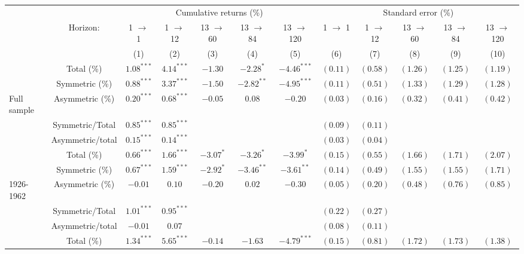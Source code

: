 \begin{tabular}{lccccccccccc}
   \toprule & & \multicolumn{5}{c}{Cumulative returns (\%)} & \multicolumn{5}{c}{Standard error (\%)} \\
 \cmidrule(l){2-7} \cmidrule(l){8-12} & Horizon: & 1 $\rightarrow$ 1 & 1 $\rightarrow$ 12 & 13 $\rightarrow$ 60 & 13 $\rightarrow$ 84 & 13 $\rightarrow$ 120 & 1 $\rightarrow$ 1 & 1 $\rightarrow$ 12 & 13 $\rightarrow$ 60 & 13 $\rightarrow$ 84 & 13 $\rightarrow$ 120 \\ 
   \cmidrule(l){3-7} \cmidrule(l){8-12} \vspace{5pt} &  & (1) & (2) & (3) & (4) & (5) & (6) & (7) & (8) & (9) & (10) \\ 
   & Total (\%) & $1.08^{***}$ & $4.14^{***}$ & $-1.30$ & $-2.28^{*}$ & $-4.46^{***}$ & $(0.11)$ & $(0.58)$ & $(1.26)$ & $(1.25)$ & $(1.19)$ \\ 
   & Symmetric (\%) & $0.88^{***}$ & $3.37^{***}$ & $-1.50$ & $-2.82^{**}$ & $-4.95^{***}$ & $(0.11)$ & $(0.51)$ & $(1.33)$ & $(1.29)$ & $(1.28)$ \\ 
   \vspace{5pt}Full sample & Asymmetric (\%) & $0.20^{***}$ & $0.68^{***}$ & $-0.05$ & $0.08$ & $-0.20$ & $(0.03)$ & $(0.16)$ & $(0.32)$ & $(0.41)$ & $(0.42)$ \\ 
   & Symmetric/Total & $0.85^{***}$ & $0.85^{***}$ &  &  &  & $(0.09)$ & $(0.11)$ &  &  &  \\ 
   \vspace{5pt} & Asymmetric/total & $0.15^{***}$ & $0.14^{***}$ &  &  &  & $(0.03)$ & $(0.04)$ &  &  &  \\ 
   \hline & Total (\%) & $0.66^{***}$ & $1.66^{***}$ & $-3.07^{*}$ & $-3.26^{*}$ & $-3.99^{*}$ & $(0.15)$ & $(0.55)$ & $(1.66)$ & $(1.71)$ & $(2.07)$ \\ 
   & Symmetric (\%) & $0.67^{***}$ & $1.59^{***}$ & $-2.92^{*}$ & $-3.46^{**}$ & $-3.61^{**}$ & $(0.14)$ & $(0.49)$ & $(1.55)$ & $(1.55)$ & $(1.71)$ \\ 
   \vspace{5pt}1926-1962 & Asymmetric (\%) & $-0.01$ & $0.10$ & $-0.20$ & $0.02$ & $-0.30$ & $(0.05)$ & $(0.20)$ & $(0.48)$ & $(0.76)$ & $(0.85)$ \\ 
   & Symmetric/Total & $1.01^{***}$ & $0.95^{***}$ &  &  &  & $(0.22)$ & $(0.27)$ &  &  &  \\ 
   \vspace{5pt} & Asymmetric/total & $-0.01$ & $0.07$ &  &  &  & $(0.08)$ & $(0.11)$ &  &  &  \\ 
   \hline & Total (\%) & $1.34^{***}$ & $5.65^{***}$ & $-0.14$ & $-1.63$ & $-4.79^{***}$ & $(0.15)$ & $(0.81)$ & $(1.72)$ & $(1.73)$ & $(1.38)$ \\ 

\end{tabular}
